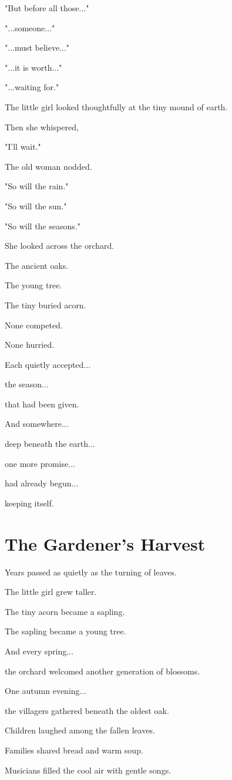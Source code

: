 \documentclass[12pt,openany]{book}
\begin{document}
"But before all those..."

"...someone..."

"...must believe..."

"...it is worth..."

"...waiting for."

The little girl looked thoughtfully at the tiny mound of earth.

Then she whispered,

"I'll wait."

The old woman nodded.

"So will the rain."

"So will the sun."

"So will the seasons."

She looked across the orchard.

The ancient oaks.

The young tree.

The tiny buried acorn.

None competed.

None hurried.

Each quietly accepted...

the season...

that had been given.

And somewhere...

deep beneath the earth...

one more promise...

had already begun...

keeping itself.
\section*{The Gardener's Harvest}

Years passed as quietly as the turning of leaves.

The little girl grew taller.

The tiny acorn became a sapling.

The sapling became a young tree.

And every spring...

the orchard welcomed another generation of blossoms.

One autumn evening...

the villagers gathered beneath the oldest oak.

Children laughed among the fallen leaves.

Families shared bread and warm soup.

Musicians filled the cool air with gentle songs.
\end{document}
